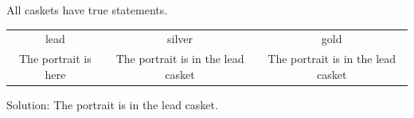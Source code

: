 All caskets have true statements.


\begin{tabular}{ccc}
\toprule
lead & silver & gold\\
The portrait is here & The portrait is in the lead casket & The portrait is in the lead casket\\
\bottomrule
\end{tabular}

Solution: The portrait is in the lead casket.